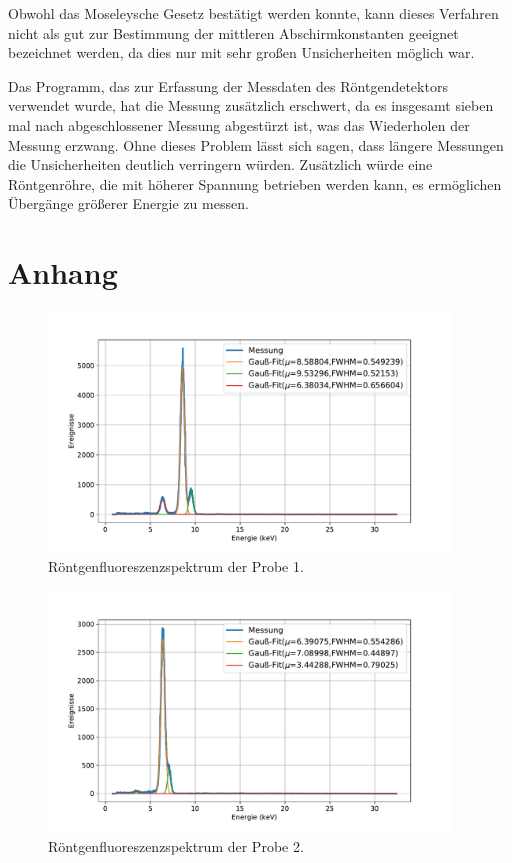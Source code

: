 \documentclass[
	a4paper,
	12pt,
	pagesize,
	ngerman
]{scrartcl}
\begin{document}
	Obwohl das Moseleysche Gesetz bestätigt werden konnte, kann dieses Verfahren nicht als gut zur Bestimmung der mittleren Abschirmkonstanten geeignet bezeichnet werden, da dies nur mit sehr großen Unsicherheiten möglich war.

	Das Programm, das zur Erfassung der Messdaten des Röntgendetektors verwendet wurde, hat die Messung zusätzlich erschwert, da es insgesamt sieben mal nach abgeschlossener Messung abgestürzt ist, was das Wiederholen der Messung erzwang. Ohne dieses Problem lässt sich sagen, dass längere Messungen die Unsicherheiten deutlich verringern würden.
	Zusätzlich würde eine Röntgenröhre, die mit höherer Spannung betrieben werden kann, es ermöglichen Übergänge größerer Energie zu messen.



	\printbibliography

	\section{Anhang}

	\begin{figure}[H]
		\includegraphics[width=0.95\textwidth]{images/1-Zn.pdf}
		\centering
		\caption{Röntgenfluoreszenzspektrum der Probe 1.}
	\end{figure}

	\begin{figure}[H]
		\includegraphics[width=0.95\textwidth]{images/2-Fe.pdf}
		\centering
		\caption{Röntgenfluoreszenzspektrum der Probe 2.}
	\end{figure}
\end{document}
